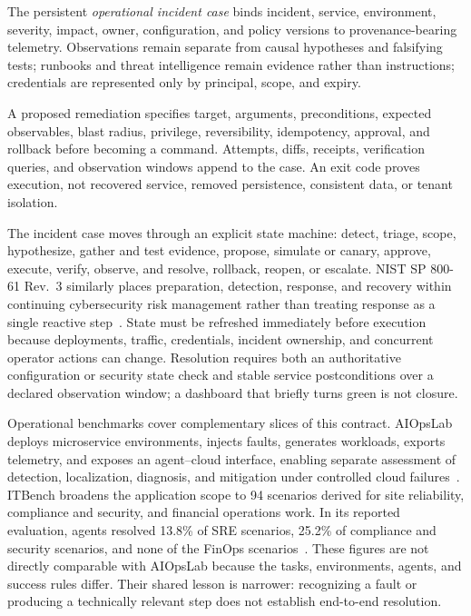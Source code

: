 The persistent \emph{operational incident case} binds incident, service, environment, severity, impact, owner, configuration, and policy versions to provenance-bearing telemetry. Observations remain separate from causal hypotheses and falsifying tests; runbooks and threat intelligence remain evidence rather than instructions; credentials are represented only by principal, scope, and expiry.

A proposed remediation specifies target, arguments, preconditions, expected observables, blast radius, privilege, reversibility, idempotency, approval, and rollback before becoming a command. Attempts, diffs, receipts, verification queries, and observation windows append to the case. An exit code proves execution, not recovered service, removed persistence, consistent data, or tenant isolation.

The incident case moves through an explicit state machine: detect, triage, scope, hypothesize, gather and test evidence, propose, simulate or canary, approve, execute, verify, observe, and resolve, rollback, reopen, or escalate. NIST SP 800-61 Rev.~3 similarly places preparation, detection, response, and recovery within continuing cybersecurity risk management rather than treating response as a single reactive step~\cite{nist2025incidentresponse}. State must be refreshed immediately before execution because deployments, traffic, credentials, incident ownership, and concurrent operator actions can change. Resolution requires both an authoritative configuration or security state check and stable service postconditions over a declared observation window; a dashboard that briefly turns green is not closure.

Operational benchmarks cover complementary slices of this contract. AIOpsLab deploys microservice environments, injects faults, generates workloads, exports telemetry, and exposes an agent--cloud interface, enabling separate assessment of detection, localization, diagnosis, and mitigation under controlled cloud failures~\cite{chen2025aiopslab}. ITBench broadens the application scope to 94 scenarios derived for site reliability, compliance and security, and financial operations work. In its reported evaluation, agents resolved 13.8\% of SRE scenarios, 25.2\% of compliance and security scenarios, and none of the FinOps scenarios~\cite{jha2025itbench}. These figures are not directly comparable with AIOpsLab because the tasks, environments, agents, and success rules differ. Their shared lesson is narrower: recognizing a fault or producing a technically relevant step does not establish end-to-end resolution.

